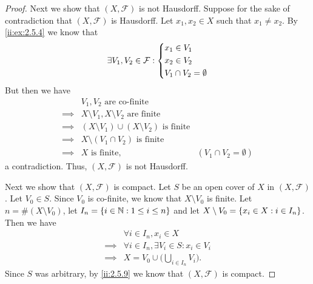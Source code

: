 \begin{proof}
  Next we show that \((X, \mathcal{F})\) is not Hausdorff.
  Suppose for the sake of contradiction that \((X, \mathcal{F})\) is Hausdorff.
  Let \(x_1, x_2 \in X\) such that \(x_1 \neq x_2\).
  By \cref{ii:ex:2.5.4} we know that
  \[
    \exists V_1, V_2 \in \mathcal{F} : \begin{dcases}
      x_1 \in V_1 \\
      x_2 \in V_2 \\
      V_1 \cap V_2 = \emptyset
    \end{dcases}
  \]
  But then we have
  \begin{align*}
             & V_1, V_2 \text{ are co-finite}                                                          \\
    \implies & X \setminus V_1, X \setminus V_2 \text{ are finite}                                     \\
    \implies & (X \setminus V_1) \cup (X \setminus V_2) \text{ is finite}                              \\
    \implies & X \setminus (V_1 \cap V_2) \text{ is finite}                                            \\
    \implies & X \text{ is finite},                                       & (V_1 \cap V_2 = \emptyset)
  \end{align*}
  a contradiction.
  Thus, \((X, \mathcal{F})\) is not Hausdorff.

  Next we show that \((X, \mathcal{F})\) is compact.
  Let \(S\) be an open cover of \(X\) in \((X, \mathcal{F})\).
  Let \(V_0 \in S\).
  Since \(V_0\) is co-finite, we know that \(X \setminus V_0\) is finite.
  Let \(n = \#(X \setminus V_0)\), let \(I_n = \left\lbrace i \in \mathbb{N} : 1 \leq i \leq n\right\rbrace\) and let \(X \setminus V_0 = \left\lbrace x_i \in X : i \in I_n\right\rbrace\).
  Then we have
  \begin{align*}
             & \forall i \in I_n, x_i \in X                       \\
    \implies & \forall i \in I_n, \exists V_i \in S : x_i \in V_i \\
    \implies & X = V_0 \cup \bigg(\bigcup_{i \in I_n} V_i\bigg).
  \end{align*}
  Since \(S\) was arbitrary, by \cref{ii:2.5.9} we know that \((X, \mathcal{F})\) is compact.


\end{proof}
